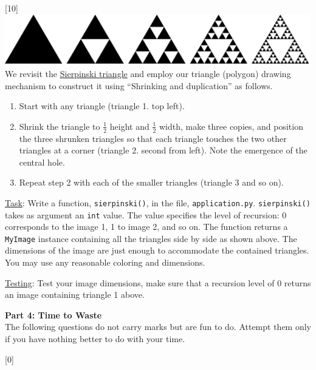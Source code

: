 \documentclass[addpoints]{exam}
\begin{document}
\begin{questions}
  [10]
    \includegraphics[width=\linewidth]{sierpinski2}\\
  We revisit the \href{https://en.wikipedia.org/wiki/Sierpinski_triangle}{Sierpinski triangle} and employ our triangle (polygon) drawing mechanism to construct it using ``Shrinking and duplication'' as follows.
  \begin{enumerate}
  \item Start with any triangle (triangle 1. top left).
  \item Shrink the triangle to $\frac{1}{2}$ height and $\frac{1}{2}$ width, make three copies, and position the three shrunken triangles so that each triangle touches the two other triangles at a corner (triangle 2. second from left). Note the emergence of the central hole.
  \item Repeat step 2 with each of the smaller triangles (triangle 3 and so on).
  \end{enumerate}

  \underline{Task}: Write a function, \texttt{sierpinski()}, in the file, \texttt{application.py}. \texttt{sierpinski()} takes as argument an \texttt{int} value. The value specifies the level of recursion: 0 corresponds to the image 1, 1 to image 2, and so on. The function returns a \texttt{MyImage} instance containing all the triangles side by side as shown above. The dimensions of the image are just enough to accommodate the contained triangles. You may use any reasonable coloring and dimensions.

  \underline{Testing}: Test your image dimensions, make sure that a recursion level of 0 returns an image containing triangle 1 above.
  
\begin{EnvFullwidth}
  {\Large\bf Part 4: Time to Waste}\\
The following questions do not carry marks but are fun to do. Attempt them only if you have nothing better to do with your time.
\end{EnvFullwidth}


  [0]
  \label{q:interpolate}


\end{questions}
\end{document}
